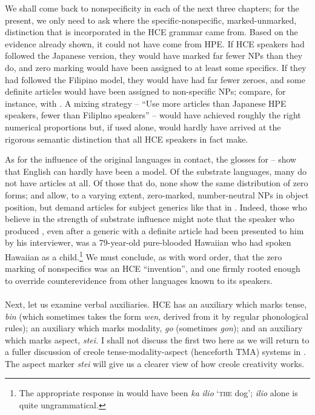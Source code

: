 We shall come back to nonspecificity in each of the next three chapters; for the present, we only need to ask where the specific-nonspecific, marked-unmarked, distinction that is incorporated in the HCE grammar came from. Based on the evidence already shown, it could not have come from HPE. If HCE speakers had followed the Japanese version, they would have marked far fewer NPs than they do, and zero marking would have been assigned to at least some specifics. If they had followed the Filipino model, they would have had far fewer zeroes, and some definite articles would have been assigned to non-specific NPs; compare, for instance,  with . A mixing strategy -- ``Use more articles than Japanese HPE speakers, fewer than Filiplno speakers'' -- would have achieved roughly the right numerical proportions but, if used alone, would hardly have arrived at the rigorous semantic distinction that all HCE speakers in fact make.

As for the influence of the original languages in contact, the glosses for -- show that English can hardly have been a model. Of the substrate languages, many do not have articles at all. Of those that do, none show the same distribution of zero forms;  and  allow, to a varying extent, zero-marked, number-neutral NPs in object position, but demand articles for subject generics like that in . Indeed, those who believe in the strength of substrate
influence might note that the speaker who produced , even after a generic with a definite article had been presented to him by his inter\-viewer, was a 79-year-old pure-blooded Hawaiian who had spoken Hawaiian as a child.\footnote{The appropriate response in  would have been \textit{ka} \textit{ilio} `\textsc{the} dog'; \textit{ilio} alone is quite ungrammatical.} We must conclude, as with word order, that the zero marking of nonspecifics was an HCE ``invention'', and one firmly rooted enough to override counterevidence from other languages known to its speakers.\\\\

Next, let us examine verbal auxiliaries. HCE has an auxiliary which marks tense, \textit{bin} (which sometimes takes the form \textit{wen}, derived from it by regular phonological rules); an auxiliary which marks modality, \textit{go} (sometimes \textit{gon}); and an auxiliary which marks aspect, \textit{stei.} I shall not discuss the first two here as we will return to a fuller discus\-sion of creole tense-modality-aspect (henceforth TMA) systems in . The aspect marker \textit{stei} will give us a clearer view of how creole creativity works.

